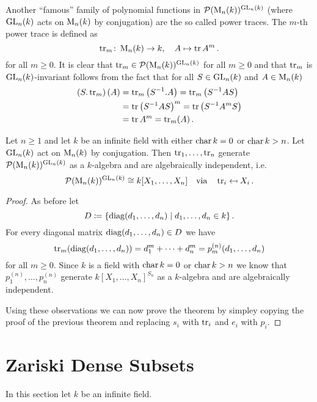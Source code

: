 Another ``famous'' family of polynomial functions in $\mathcal{P}(\operatorname{M}_n(k))^{\operatorname{GL}_n(k)}$ (where $\operatorname{GL}_n(k)$ acts on $\operatorname{M}_n(k)$ by conjugation) are the so called power traces.
The $m$-th power trace is defined as
\[
          \operatorname{tr}_m
  \colon  \operatorname{M}_n(k)
  \to     k,
 \quad    A
  \mapsto \operatorname{tr} A^m \,.
\]
for all $m \geq 0$.
It is clear that $\operatorname{tr}_m \in \mathcal{P}(\operatorname{M}_n(k))^{\operatorname{GL}_n(k)}$ for all $m \geq 0$ and that $\operatorname{tr}_m$ is $\operatorname{GL}_n(k)$-invariant follows from the fact that for all $S \in \operatorname{GL}_n(k)$ and $A \in \operatorname{M}_n(k)$
\begin{align*}
      \left( S.\operatorname{tr}_m \right)(A)
  &=  \operatorname{tr}_m\left( S^{-1}.A \right)
   =  \operatorname{tr}_m\left( S^{-1} A S \right)  \\
  &=  \operatorname{tr} \left( S^{-1} A S \right)^m
   =  \operatorname{tr} \left( S^{-1} A^m S \right) \\
  &=  \operatorname{tr} A^m
   =  \operatorname{tr}_m(A) \,.
\end{align*}


\begin{thrm}
  Let $n \geq 1$ and let $k$ be an infinite field with either $\operatorname{char} k = 0$ or $\operatorname{char} k > n$.
  Let $\operatorname{GL}_n(k)$ act on $\operatorname{M}_n(k)$ by conjugation.
  Then $\operatorname{tr}_1, \dotsc, \operatorname{tr}_n$ generate $\mathcal{P}(\operatorname{M}_n(k))^{\operatorname{GL}_n(k)}$ as a $k$-algebra and are algebraically independent, i.e.\
  \[
          \mathcal{P}(\operatorname{M}_n(k))^{\operatorname{GL}_n(k)}
    \cong k[X_1, \dotsc, X_n]
    \quad\text{via}\quad
              \operatorname{tr}_i
    \mapsfrom X_i \,.
  \]
\end{thrm}
\begin{proof}
  As before let 
  \[
              D
    \coloneqq \{
                \operatorname{diag}(d_1, \dotsc, d_n)
              \mid
                    d_1, \dotsc, d_n
                \in k
              \} \,.
  \]
  For every diagonal matrix $\operatorname{diag}(d_1, \dotsc, d_n) \in D$ we have
  \[
      \operatorname{tr}_m( \operatorname{diag}(d_1, \dotsc, d_n) )
    = d_1^m + \dotsb + d_n^m
    = p^{(n)}_m(d_1, \dotsc, d_n)
  \]
  for all $m \geq 0$.
  Since $k$ is a field with $\operatorname{char} k = 0$ or $\operatorname{char} k > n$ we know that $p^{(n)}_1, \dotsc, p^{(n)}_n$ generate $k[X_1, \dotsc, X_n]^{S_n}$ as a $k$-algebra and are algebraically independent.
  
  Using these observations we can now prove the theorem by simpley copying the proof of the previous theorem and replacing $s_i$ with $\operatorname{tr}_i$ and $e_i$ with $p_i$.
\end{proof}





\section{Zariski Dense Subsets}
In this section let $k$ be an infinite field.


